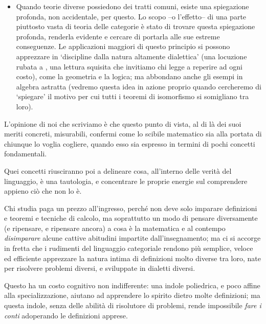 \begin{itemize}
	\item Quando teorie diverse possiedono dei tratti comuni, esiste una spiegazione profonda, non accidentale, per questo. Lo scopo --o l'effetto-- di una parte piuttosto vasta di teoria delle categorie è stato di trovare questa spiegazione profonda, renderla evidente e cercare di portarla alle sue estreme conseguenze. Le applicazioni maggiori di questo principio si possono apprezzare in `discipline dalla natura altamente dialettica' (una locuzione rubata a \cite{lawvere1999profilo}, una lettura squisita che invitiamo chi legge a reperire ad ogni costo), come la geometria e la logica; ma abbondano anche gli esempi in algebra astratta (vedremo questa idea in azione proprio quando cercheremo di `spiegare' il motivo per cui tutti i teoremi di isomorfismo si somigliano tra loro).
\end{itemize}
L'opinione di noi che scriviamo è che questo punto di vista, al di là dei suoi meriti concreti, misurabili, confermi come lo scibile matematico sia alla portata di chiunque lo voglia cogliere, quando esso sia espresso in termini di pochi concetti fondamentali.

Quei concetti riusciranno poi a delineare cosa, all'interno delle verità del linguaggio, è una tautologia, e concentrare le proprie energie sul comprendere appieno ciò che non lo è.

Chi studia paga un prezzo all'ingresso, perché non deve solo imparare definizioni e teoremi e tecniche di calcolo, ma soprattutto un modo di pensare diversamente (e ripensare, e ripensare ancora) a cosa è la matematica e al contempo \emph{disimparare} alcune cattive abitudini impartite dall'insegnamento; ma ci si accorge in fretta che i rudimenti del linguaggio categoriale rendono più semplice, veloce ed efficiente apprezzare la natura intima di definizioni molto diverse tra loro, nate per risolvere problemi diversi, e sviluppate in dialetti diversi.

Questo ha un costo cognitivo non indifferente: una indole poliedrica, e poco affine alla specializzazione, aiutano ad apprendere lo spirito dietro molte definizioni; ma questa indole, senza delle abilità di risolutore di problemi, rende impossibile \emph{fare i conti} adoperando le definizioni apprese.

